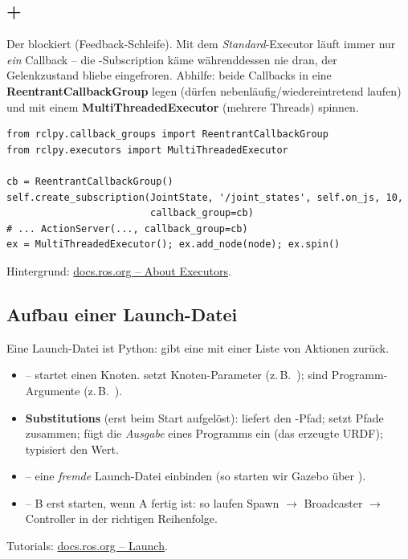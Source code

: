 \subsection{ + }
Der  blockiert (Feedback-Schleife). Mit dem
\emph{Standard}-Executor läuft immer nur \emph{ein} Callback -- die
-Subscription käme währenddessen nie dran, der Gelenkzustand
bliebe eingefroren. Abhilfe: beide Callbacks in eine \textbf{ReentrantCallbackGroup}
legen (dürfen nebenläufig/wiedereintretend laufen) und mit einem
\textbf{MultiThreadedExecutor} (mehrere Threads) spinnen.
\begin{lstlisting}[style=py]
from rclpy.callback_groups import ReentrantCallbackGroup
from rclpy.executors import MultiThreadedExecutor

cb = ReentrantCallbackGroup()
self.create_subscription(JointState, '/joint_states', self.on_js, 10,
                         callback_group=cb)
# ... ActionServer(..., callback_group=cb)
ex = MultiThreadedExecutor(); ex.add_node(node); ex.spin()
\end{lstlisting}
\noindent Hintergrund: \href{https://docs.ros.org/en/jazzy/Concepts/Intermediate/About-Executors.html}{docs.ros.org -- About Executors}.

\subsection{Aufbau einer Launch-Datei}
Eine Launch-Datei ist Python:  gibt eine
 mit einer Liste von Aktionen zurück.
\begin{itemize}
\item {} -- startet einen Knoten.  setzt
  Knoten-Parameter (z.\,B.\ ); 
  sind Programm-Argumente (z.\,B.\ ).
\item \textbf{Substitutions} (erst beim Start aufgelöst):
   liefert den -Pfad;
   setzt Pfade zusammen;
   fügt die \emph{Ausgabe} eines Programms ein
  (das erzeugte URDF);  typisiert
  den Wert.
\item {} -- eine \emph{fremde} Launch-Datei
  einbinden (so starten wir Gazebo über ).
\item {}
  -- B erst starten, wenn A fertig ist: so laufen Spawn $\rightarrow$
  Broadcaster $\rightarrow$ Controller in der richtigen Reihenfolge.
\end{itemize}
\noindent Tutorials: \href{https://docs.ros.org/en/jazzy/Tutorials/Intermediate/Launch/Launch-Main.html}{docs.ros.org -- Launch}.

